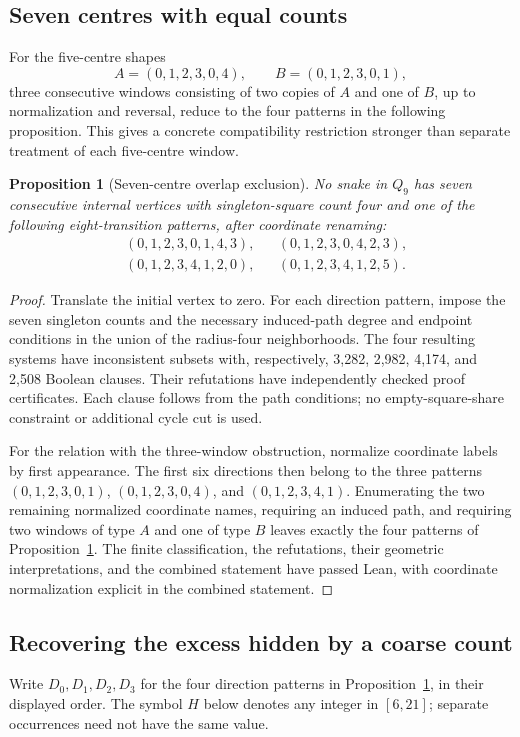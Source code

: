 \documentclass[11pt,a4paper]{article}
\newtheorem{proposition}[theorem]{Proposition}
\theoremstyle{definition}
\theoremstyle{remark}
\newcommand{\Q}{Q}
\begin{document}
\subsection{Seven centres with equal counts}\label{sec:share-overlap}
For the five-centre shapes
\[
A=(0,1,2,3,0,4),\qquad B=(0,1,2,3,0,1),
\]
three consecutive windows consisting of two copies of $A$ and one of $B$, up to normalization and reversal, reduce to the four patterns in the following proposition. This gives a concrete compatibility restriction stronger than separate treatment of each five-centre window.

\begin{proposition}[Seven-centre overlap exclusion]\label{prop:seven-overlap}
No snake in $\Q_9$ has seven consecutive internal vertices with singleton-square count four and one of the following eight-transition patterns, after coordinate renaming:
\[
\begin{aligned}
&(0,1,2,3,0,1,4,3), &&(0,1,2,3,0,4,2,3),\\
&(0,1,2,3,4,1,2,0), &&(0,1,2,3,4,1,2,5).
\end{aligned}
\]
\end{proposition}
\begin{proof}
Translate the initial vertex to zero. For each direction pattern, impose the seven singleton counts and the necessary induced-path degree and endpoint conditions in the union of the radius-four neighborhoods. The four resulting systems have inconsistent subsets with, respectively, 3,282, 2,982, 4,174, and 2,508 Boolean clauses. Their refutations have independently checked proof certificates. Each clause follows from the path conditions; no empty-square-share constraint or additional cycle cut is used.

For the relation with the three-window obstruction, normalize coordinate labels by first appearance. The first six directions then belong to the three patterns $(0,1,2,3,0,1)$, $(0,1,2,3,0,4)$, and $(0,1,2,3,4,1)$. Enumerating the two remaining normalized coordinate names, requiring an induced path, and requiring two windows of type $A$ and one of type $B$ leaves exactly the four patterns of Proposition~\ref{prop:seven-overlap}. The finite classification, the refutations, their geometric interpretations, and the combined statement have passed Lean, with coordinate normalization explicit in the combined statement.
\end{proof}

\subsection{Recovering the excess hidden by a coarse count}\label{sec:coarse-excess}
Write $D_0,D_1,D_2,D_3$ for the four direction patterns in Proposition~\ref{prop:seven-overlap}, in their displayed order. The symbol $H$ below denotes any integer in $[6,21]$; separate occurrences need not have the same value.
\end{document}
